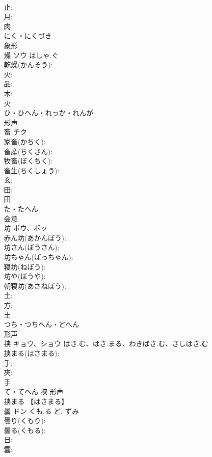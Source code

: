 \documentclass[8pt]{extreport}
\begin{document}
\begin{CJK}{UTF8}{min}
\\	止: 
\\	月: 
\\	肉	
\\	にく・にくづき	
\\	象形 
\\	燥	ソウ	はしゃ.ぐ		
\\	乾燥(かんそう): 
\\	火: 
\\	品: 
\\	木: 
\\	火	
\\	ひ・ひへん・れっか・れんが	
\\	形声 
\\	畜	チク			
\\	家畜(かちく): 
\\	畜産(ちくさん): 
\\	牧畜(ぼくちく): 
\\	畜生(ちくしょう): 
\\	玄: 
\\	田: 
\\	田	
\\	た・たへん	
\\	会意 
\\	坊	ボウ、ボッ			
\\	赤ん坊(あかんぼう): 
\\	坊さん(ぼうさん): 
\\	坊ちゃん(ぼっちゃん): 
\\	寝坊(ねぼう): 
\\	坊や(ぼうや): 
\\	朝寝坊(あさねぼう): 
\\	土: 
\\	方: 
\\	土	
\\	つち・つちへん・どへん	
\\	形声 
\\	挟	キョウ、ショウ	はさ.む、はさ.まる、わきばさ.む、さしはさ.む		
\\	挟まる(はさまる): 
\\	手: 
\\	夾: 
\\	手	
\\	て・てへん	挾	形声 
\\	挟まる 【はさまる】 
\\	曇	ドン	くも.る	ど, ずみ	
\\	曇り(くもり): 
\\	曇る(くもる): 
\\	日: 
\\	雲: 

\end{CJK}
\end{document}
